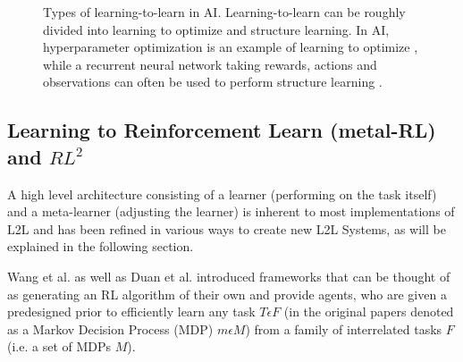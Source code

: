 \documentclass[letterpaper, 10 pt, conference]{ieeeconf}  %
\begin{document}
\begin{figure}[thpb]
        \centering
  \caption{Types of learning-to-learn in AI. Learning-to-learn can be roughly divided into learning to optimize and structure learning.
  In AI, hyperparameter optimization is
  an example of learning to optimize \cite{maclaurinGradientbasedHyperparameterOptimization}, while a 
  recurrent neural network taking rewards, actions and observations
   can often be used to perform structure learning \cite{wangLearningReinforcementLearn2016} \cite{lansdellLearningtolearn2018}.}
        \label{figurelabel}
     \end{figure}


\subsection{Learning to Reinforcement Learn (metal-RL) and $RL^2$}

A high level architecture consisting of a learner (performing on the task itself) and a meta-learner (adjusting the learner) is
inherent to most implementations of L2L \cite{lansdellLearningtolearn2018} and has been refined in various ways to create new L2L Systems, as will be
explained in the following section.

Wang et al.\cite{wangLearningReinforcementLearn2016} as well as Duan et al.\cite{duanRLFastReinforcement2016} introduced 
frameworks that can be thought of as generating an RL algorithm of their own and
provide agents, who are given a predesigned prior to efficiently learn any task $T \epsilon F$ (in the original papers denoted as 
a Markov Decision Process (MDP) $m \epsilon M$) from a family of interrelated tasks $F$(i.e. a set of MDPs $M$). 
\end{document}
